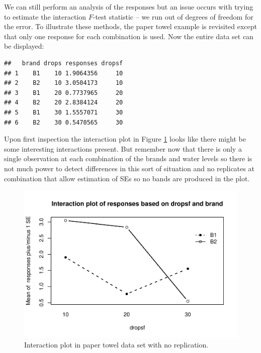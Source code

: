\documentclass[]{book}
\newenvironment{Shaded}{\begin{snugshade}}{\end{snugshade}}
\newcommand{\KeywordTok}[1]{\textcolor[rgb]{0.13,0.29,0.53}{\textbf{#1}}}
\newcommand{\StringTok}[1]{\textcolor[rgb]{0.31,0.60,0.02}{#1}}
\newcommand{\OperatorTok}[1]{\textcolor[rgb]{0.81,0.36,0.00}{\textbf{#1}}}
\newcommand{\NormalTok}[1]{#1}
\theoremstyle{definition}
\theoremstyle{definition}
\theoremstyle{remark}
\begin{document}
We can still perform an analysis of the responses but an issue occurs
with trying to estimate the interaction \(F\)-test statistic -- we run
out of degrees of freedom for the error. To illustrate these methods,
the paper towel example is revisited except that only one response for
each combination is used. Now the entire data set can be displayed:

\begin{Shaded}
\end{Shaded}

\begin{verbatim}
##   brand drops responses dropsf
## 1    B1    10 1.9064356     10
## 2    B2    10 3.0504173     10
## 3    B1    20 0.7737965     20
## 4    B2    20 2.8384124     20
## 5    B1    30 1.5557071     30
## 6    B2    30 0.5470565     30
\end{verbatim}

Upon first inspection the interaction plot in Figure
\ref{fig:Figure4-17} looks like there might be some interesting
interactions present. But remember now that there is only a single
observation at each combination of the brands and water levels so there
is not much power to detect differences in this sort of situation and no
replicates at combination that allow estimation of SEs so no bands are
produced in the plot.




\begin{figure}
\centering
\includegraphics{04-twoWayAnova_files/figure-latex/Figure4-17-1.pdf}
\caption{\label{fig:Figure4-17}Interaction plot in paper towel data set with no
replication.}
\end{figure}
\end{document}
